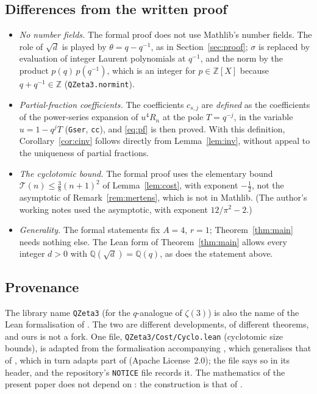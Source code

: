 \documentclass[11pt]{amsart}
\theoremstyle{definition}
\theoremstyle{remark}
\numberwithin{equation}{section}
\newcommand{\ZZ}{\mathbb{Z}}
\newcommand{\QQ}{\mathbb{Q}}
\newcommand{\Tot}{\mathcal T}
\newcommand{\lean}[1]{{\def\_{\textunderscore\allowbreak}\texttt{#1}}}
\begin{document}
\subsection*{Differences from the written proof}
\begin{itemize}
\item \emph{No number fields.} The formal proof does not use Mathlib's number fields. The role of $\sqrt d$ is played
by $\theta=q-q^{-1}$, as in Section~\ref{sec:proof}; $\sigma$ is replaced by evaluation of integer Laurent polynomials
at $q^{-1}$, and the norm by the product $p(q)\,p(q^{-1})$, which is an integer for $p\in\ZZ[X]$ because
$q+q^{-1}\in\ZZ$ (\lean{QZeta3.norm\_int}).
\item \emph{Partial-fraction coefficients.} The coefficients $c_{s,j}$ are \emph{defined} as the coefficients of the
power-series expansion of $u^4R_n$ at the pole $T=q^{-j}$, in the variable $u=1-q^jT$ (\lean{Gser}, \lean{cc}), and
\eqref{eq:pf} is then proved. With this definition, Corollary~\ref{cor:cinv} follows directly from Lemma~\ref{lem:inv},
without appeal to the uniqueness of partial fractions.
\item \emph{The cyclotomic bound.} The formal proof uses the elementary bound $\Tot(n)\le\frac38(n+1)^2$ of
Lemma~\ref{lem:cost}, with exponent $-\frac12$, not the asymptotic of Remark~\ref{rem:mertens}, which is not in Mathlib.
(The author's working notes used the asymptotic, with exponent $12/\pi^2-2$.)
\item \emph{Generality.} The formal statements fix $A=4$, $r=1$; Theorem~\ref{thm:main} needs nothing else. The Lean form
of Theorem~\ref{thm:main} allows every integer $d>0$ with $\QQ(\sqrt d)=\QQ(q)$, as does the statement above.
\end{itemize}

\subsection*{Provenance}
The library name \lean{QZeta3} (for the $q$-analogue of $\zeta(3)$) is also the name of the Lean formalisation
\cite{QZ3} of \cite{UPL}. The two are different developments, of different theorems, and ours is not a fork. One file,
\lean{QZeta3/Cost/Cyclo.lean} (cyclotomic size bounds), is adapted from the formalisation accompanying \cite{Kri26b},
which generalises that of \cite{Kri26a}, which in turn adapts part of \cite{QZ3} (Apache License~2.0); the file says so in
its header, and the repository's \lean{NOTICE} file records it. The mathematics of the present paper does not depend on
\cite{UPL}: the construction is that of \cite{KRZ06}.
\end{document}
